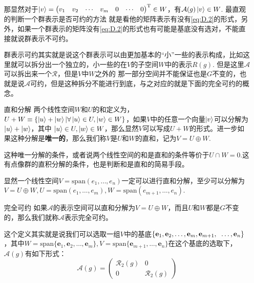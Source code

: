 那显然对于$\ket{v}=\begin{pmatrix}v_1&v_2&\cdots&v_m&0&\cdots&0\end{pmatrix}^{\mathrm{T}}\in W$，有$\mathcal{A}(g)\ket{v}\in W$. 最直观的判断一个群表示是否可约的方法
就是看他的矩阵表示有没有\ref{eq:D.2}的形式，另外，如果一个群表示的矩阵没有\ref{eq:D.2}的形式也有可能是基底没有选对，不能直接就说群表示不可约。

群表示可约其实就是说这个群表示可以由更加基本的“小”一些的表示构成，比如这里就可以拆分出一个独立的，小一些的在$V$的子空间$W$中的表示$R(g)$. 但是这里$\mathscr{A}$可以拆出来一个$\mathscr{R}$，但是$V$中$W$之外的
那一部分空间并不能保证也是$G$不变的，也就是说$\mathscr{A}$可约，但是这种拆分不能进行到底，与之对应的就是下面的完全可约的概念。
\begin{define}{直和分解}
    两个线性空间$W$和$U$的和定义为，$U+W\equiv \{\ket{u}+\ket{w}|\forall \ket{u}\in U,\ket{w}\in W\}$，如果$V$中的任意一个向量$\ket{v}$可以分解为$\ket{u}+\ket{w}$，其中
    $\ket{u}\in U,\ket{w}\in W$，那么显然$V$可以写成$U+W$的形式。进一步如果这种分解是\textbf{唯一的}，那么我们称$V$是$U$和$W$的直和，记为$V=U\oplus W$.

    \setlength\parindent{2em}这种唯一分解的条件，或者说两个线性空间的和是直和的条件等价于$U\cap W={0}$.这有点像群的直积分解的条件，也是判断和是直和的简易手段。
\end{define}

显然一个线性空间$V=\mathrm{span}(e_1,\ldots,e_n)$一定可以进行直和分解，至少可以分解为$V=U\oplus W,U=\mathrm{span}(e_1,\ldots,e_m),W=\mathrm{span}(e_{m+1},\ldots,e_n)$.
\begin{define}{完全可约}
    如果$\mathscr{A}$的表示空间可以直和分解为$V=U\oplus W$，而且$U$和$W$都是$G$不变的，那么我们就称$\mathscr{A}$表示完全可约。
\end{define}
这个定义其实就是说我们可以选取一组$V$中的基底$\left\{\mathbf{e}_1,\mathbf{e}_2,\ldots,\mathbf{e}_m,\mathbf{e}_{m+1},\right.\\\left.\ldots,\mathbf{e}_n\right\}$，其中$W=\mathrm{span}\{\mathbf{e}_1,\mathbf{e}_2,\ldots,\mathbf{e}_m\},V=\mathrm{span}\{\mathbf{e}_{m+1},\ldots,\mathbf{e}_n\}$在这个基底的选取下，
$\mathcal{A}(g)$有如下形式：
\begin{equation}
    \label{eq:D.3}
    \mathcal{A}(g)=\begin{pmatrix}
        \mathcal{R}_2(g) &{0} \\
         {0} & \mathcal{R}_2(g)
       \end{pmatrix}
\end{equation}


